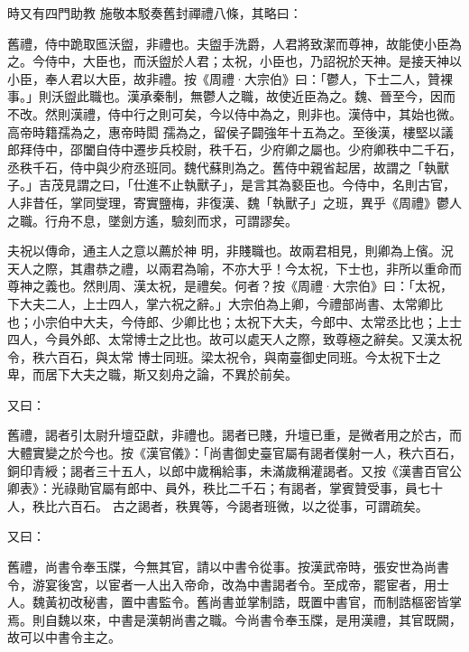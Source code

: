 \begin{pinyinscope}
 時又有四門助教
 施敬本駁奏舊封禪禮八條，其略曰：



 舊禮，侍中跪取匜沃盥，非禮也。夫盥手洗爵，人君將致潔而尊神，故能使小臣為之。今侍中，大臣也，而沃盥於人君；太祝，小臣也，乃詔祝於天神。是接天神以小臣，奉人君以大臣，故非禮。按《周禮·大宗伯》曰：「鬱人，下士二人，贊裸事。」則沃盥此職也。漢承秦制，無鬱人之職，故使近臣為之。魏、晉至今，因而不改。然則漢禮，侍中行之則可矣，今以侍中為之，則非也。漢侍中，其始也微。高帝時籍孺為之，惠帝時閎
 孺為之，留侯子闢強年十五為之。至後漢，樓堅以議郎拜侍中，邵闔自侍中遷步兵校尉，秩千石，少府卿之屬也。少府卿秩中二千石，丞秩千石，侍中與少府丞班同。魏代蘇則為之。舊侍中親省起居，故謂之「執獸子。」吉茂見謂之曰，「仕進不止執獸子」，是言其為褻臣也。今侍中，名則古官，人非昔任，掌同燮理，寄實鹽梅，非復漢、魏「執獸子」之班，異乎《周禮》鬱人之職。行舟不息，墜劍方遙，驗刻而求，可謂謬矣。



 夫祝以傳命，通主人之意以薦於神
 明，非賤職也。故兩君相見，則卿為上儐。況天人之際，其肅恭之禮，以兩君為喻，不亦大乎！今太祝，下士也，非所以重命而尊神之義也。然則周、漢太祝，是禮矣。何者？按《周禮·大宗伯》曰：「太祝，下大夫二人，上士四人，掌六祝之辭。」大宗伯為上卿，今禮部尚書、太常卿比也；小宗伯中大夫，今侍郎、少卿比也；太祝下大夫，今郎中、太常丞比也；上士四人，今員外郎、太常博士之比也。故可以處天人之際，致尊極之辭矣。又漢太祝令，秩六百石，與太常
 博士同班。梁太祝令，與南臺御史同班。今太祝下士之卑，而居下大夫之職，斯又刻舟之論，不異於前矣。



 又曰：



 舊禮，謁者引太尉升壇亞獻，非禮也。謁者已賤，升壇已重，是微者用之於古，而大體實變之於今也。按《漢官儀》：「尚書御史臺官屬有謁者僕射一人，秩六百石，銅印青綬；謁者三十五人，以郎中歲稱給事，未滿歲稱灌謁者。又按《漢書百官公卿表》：光祿勛官屬有郎中、員外，秩比二千石；有謁者，掌賓贊受事，員七十人，秩比六百石。
 古之謁者，秩異等，今謁者班微，以之從事，可謂疏矣。



 又曰：



 舊禮，尚書令奉玉牒，今無其官，請以中書令從事。按漢武帝時，張安世為尚書令，游宴後宮，以宦者一人出入帝命，改為中書謁者令。至成帝，罷宦者，用士人。魏黃初改秘書，置中書監令。舊尚書並掌制誥，既置中書官，而制誥樞密皆掌焉。則自魏以來，中書是漢朝尚書之職。今尚書令奉玉牒，是用漢禮，其官既闕，故可以中書令主之。




\end{pinyinscope}
